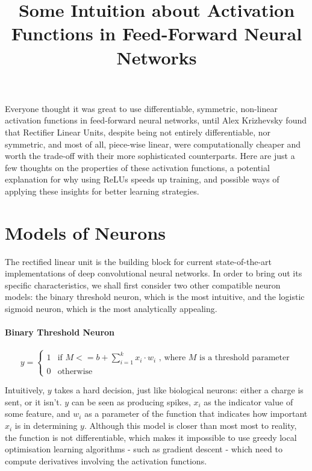 \documentclass[a4paper,11pt]{article}
\title{Some Intuition about Activation Functions in Feed-Forward Neural Networks}
\begin{document}
\maketitle

\abstract
{
Everyone thought it was great to use differentiable, symmetric, non-linear activation functions in feed-forward neural networks, until Alex Krizhevsky \cite{krizhevsky} found that Rectifier Linear Units, despite being not entirely differentiable, nor symmetric, and most of all, piece-wise linear, were computationally cheaper and worth the trade-off with their more sophisticated counterparts. Here are just a few thoughts on the properties of these activation functions, a potential explanation for why using ReLUs speeds up training, and possible ways of applying these insights for better learning strategies.
}

\clearpage

\section{Models of Neurons}

The rectified linear unit is the building block for current state-of-the-art implementations of deep convolutional neural networks. In order to bring out its specific characteristics, we shall first consider two other compatible neuron models: the binary threshold neuron, which is the most intuitive, and the logistic sigmoid neuron, which is the most analytically appealing. \\

\paragraph{Binary Threshold Neuron}
\begin{equation}
y = \begin{cases} 1 & \mbox{if } M <= b + \sum\limits_{i=1}^k x_{i}\cdot w_{i}  \text{ , where } M \text{ is a threshold parameter} \\ 
				  0 & \mbox{otherwise} \end{cases}
\end{equation}

Intuitively, $y$ takes a hard decision, just like biological neurons: either a charge is sent, or it isn't. $y$ can be seen as producing spikes, $x_i$ as the indicator value of some feature, and $w_i$ as a parameter of the function that indicates how important $x_i$ is in determining $y$. Although this model is closer than most most to reality, the function is not differentiable, which makes it impossible to use greedy local optimisation learning algorithms - such as gradient descent - which need to compute derivatives involving the activation functions.
\end{document}
